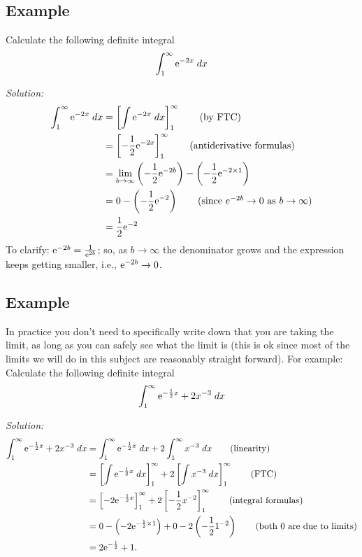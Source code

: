 \subsection{Example}
Calculate the following definite integral
\[
\int_1^\infty \mathrm{e}^{-2x} \; dx 
\]

\noindent \textit{Solution:} \\
\begin{align*}
\int_1^\infty \e^{-2x} \; dx
		& = \squac{\int \e^{-2x} \; dx}_1^\infty \tag{by FTC} \\
		& = \squac{-\frac{1}{2}\e^{-2x}}_1^\infty \tag{antiderivative formulas} \\
		& = \lim_{b \rightarrow \infty}\brac{-\frac{1}{2}\e^{-2b}} - \brac{-\frac{1}{2}\e^{-2\times1}} \\
		& = 0 - \brac{-\frac{1}{2}\e^{-2}} \tag{since $e^{-2b} \rightarrow 0$ as $b \rightarrow \infty$} \\
		& = \frac{1}{2}\e^{-2}
\end{align*}
To clarify: $\mathrm{e}^{-2b} = \frac{1}{\mathrm{e}^{2b}}$; so, as $b \rightarrow \infty$ the denominator grows and the expression keeps getting smaller, i.e., $\mathrm{e}^{-2b} \rightarrow 0$.

\subsection{Example}
In practice you don't need to specifically write down that you are taking the limit, as long as you can safely see what the limit is (this is ok since most of the limits we will do in this subject are reasonably straight forward). For example: \\

\noindent Calculate the following definite integral
\[
\int_1^\infty \mathrm{e}^{-\frac{1}{2}x} + 2x^{-3} \; dx 
\]

\noindent \textit{Solution:} \\
\begin{align*}
\int_1^\infty \mathrm{e}^{-\frac{1}{2}x} + 2x^{-3} \; dx  & = \int_1^\infty \mathrm{e}^{-\frac{1}{2}x} \; dx +  2\int_1^\infty x^{-3} \; dx  \tag{linearity} \\
	& =  \left[\int \mathrm{e}^{-\frac{1}{2}x} \; dx\right]_1^\infty +  2\left[\int x^{-3} \; dx\right]_1^\infty \tag{FTC} \\
	& =  \left[-2\mathrm{e}^{-\frac{1}{2}x}\right]_1^\infty +  2\left[-\frac{1}{2} x^{-2}\right]_1^\infty \tag{integral formulas} \\
	& = 0 - \left(-2\mathrm{e}^{-\frac{1}{2}\times1}\right) + 0 - 2\left(-\frac{1}{2}1^{-2}\right) \tag{both $0$ are due to limits} \\
	& = 2\mathrm{e}^{-\frac{1}{2}} + 1.
\end{align*}


